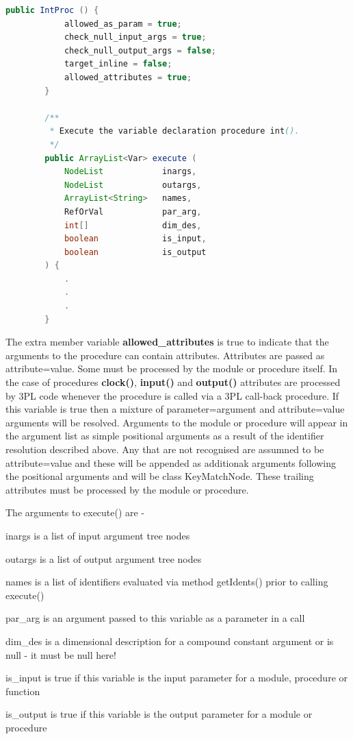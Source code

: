     \begin{lstlisting}[gobble=4, language=java]
        public IntProc () {
            allowed_as_param = true;
            check_null_input_args = true;
            check_null_output_args = false;
            target_inline = false;
            allowed_attributes = true;
        }

        /**
         * Execute the variable declaration procedure int().
         */
        public ArrayList<Var> execute (
            NodeList            inargs,
            NodeList            outargs,
            ArrayList<String>   names,
            RefOrVal            par_arg,
            int[]               dim_des,
            boolean             is_input,
            boolean             is_output
        ) {
            .
            .
            .
        }
    \end{lstlisting}
    
    The extra member variable {\bf allowed\_attributes} is true to indicate that
    the arguments to the procedure can contain attributes. Attributes are passed
    as attribute=value. Some must be processed by the module or procedure itself.
    In the case of procedures {\bf clock()}, {\bf input()} and {\bf output()}
    attributes are processed by 3PL code whenever the procedure is called via a
    3PL call-back procedure. If this variable is true then a mixture of
    parameter=argument and attribute=value arguments will be resolved. Arguments
    to the module or procedure will appear in the argument list as simple
    positional arguments as a result of the identifier resolution described
    above. Any that are not recognised are assumned to be attribute=value and
    these will be appended as additionak arguments following the positional
    arguments and will be class KeyMatchNode. These trailing attributes must be
    processed by the module or procedure.
    
    The arguments to execute() are -
      
    \blist
    \item inargs is a list of input argument tree nodes
    \item outargs is a list of output argument tree nodes
    \item names is a list of identifiers evaluated via method
            getIdents() prior to calling execute()
    \item par\_arg is an argument passed to this variable as a parameter in
            a call
    \item dim\_des is a dimensional description for a compound constant
            argument or is null - it must be null here!
    \item is\_input is true if this variable is the input parameter
            for a module, procedure or function
    \item is\_output is true if this variable is the output parameter
            for a module or procedure 
    \blend
    
